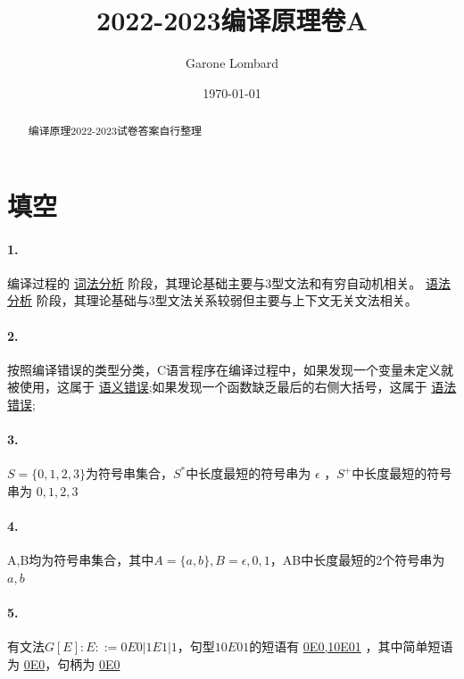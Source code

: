 \documentclass[UTF8]{ctexart} %
\title{2022-2023编译原理卷A}
\author{Garone Lombard}
\date{\today}
\begin{document}
\maketitle %

\newpage

\begin{abstract}
    编译原理2022-2023试卷答案自行整理
\end{abstract}

\newpage

\tableofcontents

\newpage

\section{填空}

\paragraph{1.} 编译过程的 \underline{词法分析} 阶段，其理论基础主要与3型文法和有穷自动机相关。 \underline{语法分析} 阶段，其理论基础与3型文法关系较弱但主要与上下文无关文法相关。

\paragraph{2.} 按照编译错误的类型分类，C语言程序在编译过程中，如果发现一个变量未定义就被使用，这属于 \underline{语义错误};如果发现一个函数缺乏最后的右侧大括号，这属于 \underline{语法错误};

\paragraph{3.} $S=\{0,1,2,3\}$为符号串集合，$S^*$中长度最短的符号串为 \underline{$\epsilon$} ，$S^+$中长度最短的符号串为 \underline{$0,1,2,3$}

\paragraph{4.} A,B均为符号串集合，其中$A=\{a,b\},B={\epsilon,0,1}$，AB中长度最短的2个符号串为 \underline{$a,b$}

\paragraph{5.} 有文法$G[E]: E::=0E0|1E1|1$，句型$10E01$的短语有 \underline{0E0,10E01} ，其中简单短语为 \underline{0E0}，句柄为 \underline{0E0}
\end{document}
